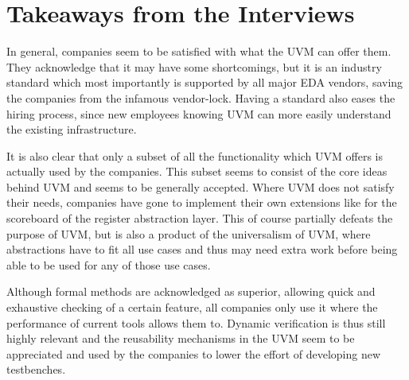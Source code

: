 \section{Takeaways from the Interviews} %


In general, companies seem to be satisfied with what the UVM can offer them. They acknowledge that it may have some
shortcomings, but it is an industry standard which most importantly is supported by all major EDA vendors, saving the
companies from the infamous vendor-lock. Having a standard also eases the hiring process, since new employees knowing
UVM can more easily understand the existing infrastructure.

It is also clear that only a subset of all the functionality which UVM offers is actually used by the companies. This
subset seems to consist of the core ideas behind UVM and seems to be generally accepted. Where UVM does not satisfy
their needs, companies have gone to implement their own extensions like for the scoreboard of the register
abstraction layer. This of course partially defeats the purpose of UVM, but is also a product of the universalism of
UVM, where abstractions have to fit all use cases and thus may need extra work before being able to be used for any
of those use cases.

Although formal methods are acknowledged as superior, allowing quick and exhaustive checking of a certain feature,
all companies only use it where the performance of current tools allows them to. Dynamic verification is thus still
highly relevant and the reusability mechanisms in the UVM seem to be appreciated and used by the companies to lower
the effort of developing new testbenches.

